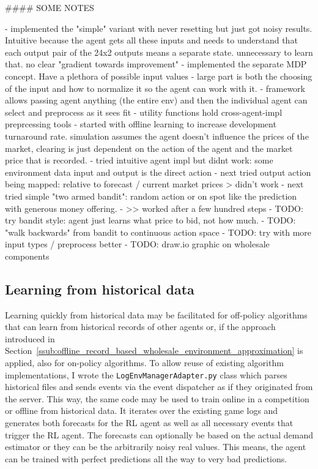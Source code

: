 \begin{markdown}
    #### SOME NOTES 
    
    - implemented the "simple" variant with never resetting but just got noisy results. Intuitive because the agent gets
    all these inputs and needs to understand that each output pair of the 24x2 outputs means a separate state.
    unnecessary to learn that. no clear "gradient towards improvement"
    - implemented the separate MDP concept. Have a plethora of possible input values
    - large part is both the choosing of the input and how to normalize it so the agent can work with it. 
    - framework allows passing agent anything (the entire env) and then the individual agent can select and preprocess
    as it sees fit
    - utility functions hold cross-agent-impl preprcessing tools
    - started with offline learning to increase development turnaround rate. simulation assumes the agent doesn't
    influence the prices of the market, clearing is just dependent on the action of the agent and the market price that
    is recorded. 
    - tried intuitive agent impl but didnt work: some environment data input and output is the direct action
    - next tried output action being mapped: relative to forecast / current market prices > didn't work
    - next tried simple "two armed bandit": random action or on spot like the prediction with generous money offering.
        - >> worked after a few hundred steps
    - TODO: try bandit style: agent just learns what price to bid, not how much.
    - TODO: "walk backwards" from bandit to continuous action space
    - TODO: try with more input types / preprocess better
    - TODO: draw.io graphic on wholesale components


\end{markdown}

\subsection{Learning from historical data}%
\label{sub:learning_from_historical_data}

Learning quickly from historical data may be facilitated for off-policy algorithms that can learn from historical
records of other agents or, if the approach introduced in
Section~\ref{ssub:offline_record_based_wholesale_environment_approximation} is applied, also for on-policy algorithms.
To allow reuse of existing algorithm implementations, I wrote the \texttt{LogEnvManagerAdapter.py} class which
parses historical files and sends events via the event dispatcher as if they originated from the server. This way, the
same code may be used to train online in a competition or offline from historical data. It iterates over the existing
game logs and generates both forecasts for the \ac{RL} agent as well as all necessary events that trigger the \ac{RL}
agent. The forecasts can optionally be based on the actual demand estimator or they can be the arbitrarily noisy real
values. This means, the agent can be trained with perfect predictions all the way to very bad predictions.

